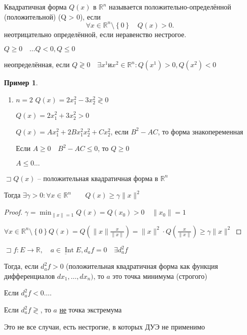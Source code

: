 \documentclass{book}
\newcommand\R{\ensuremath{\mathbb{R}}}
\theoremstyle{definition}
\newtheorem*{example}{Пример}
\DeclareMathOperator{\Int}{Int}
\begin{document}
        \begin{definition}
            Квадратичная форма $Q(x)$ в  $\R^n$ называется положительно-определённой (положительной) (Q > 0), если 
            \[\forall x\in \R^n \setminus \left\{ 0 \right\} \quad Q(x) >0.\]
        неотрицательно определённой, если неравенство нестрогое. 

        $Q \geqslant 0\quad \ldots Q<0, Q\leqslant 0$


        неопределённая, если $Q \gtrless 0\quad \exists x^1 и x^2 \in \R^n: Q\left( x^1 \right) >0, Q\left( x^2 \right) <0$
        \end{definition}
        \begin{example}
            \begin{enumerate}
                \item $n=2$ $Q(x) = 2x_1^2 - 3x_2^2 \gtrless 0$
                    
                    $Q(x) = 2x_1^2 + 3x_2^2 >0$

                    $Q(x)  =Ax_1^2 + 2Bx_1^2x_2^2 + Cx_2^2$, если $B^2-AC$, то форма знакопеременная

                    Если $A\geqslant 0\quad B^2-AC\leqslant 0$, то $Q \geqslant 0$

                    $A\leqslant 0 \ldots$
            \end{enumerate}
        \end{example}

        \begin{lemma}
            $\sqsupset Q(x)$ -- положительная квадратичная форма в $\R^n$

            Тогда $\exists \gamma >0: \forall x\in \R^n\qquad Q(x) \geqslant \gamma \|x\|^2$
        \end{lemma}
        \begin{proof}
            $\gamma  = \min_{\|x\| = 1}Q(x) = Q(x_0) >0\quad \|x_0\|=1$

            $\forall x\in \R^n \setminus \left\{ 0 \right\} Q(x) = Q\left( \|x\| \frac{x}{\|x\|}\right) = \|x\|^2 \cdot  Q\left( \frac{x}{\|x\|} \right)  \geqslant  \gamma \|x\|^2$
        \end{proof}

        \begin{statement}

            $\sqsupset f: E\to \R, \quad \underline{a\in \Int E}, d_a f = 0\quad \exists  d^2_a f$ 

            Тогда, если $d^2_af>0$ (положительная квадратичная форма как функция дифференциалов  $dx_1, \ldots, dx_{n} )$, то $a$ это точка минимума (строгого)

            Если  $d^2_af <0 \ldots.$

            Если $d^2_af \gtrless$, то $a$ \underline{не} точка экстремума

            Это не все случаи, есть нестрогие, в которых ДУЭ не применимо
        \end{statement}
\end{document}
